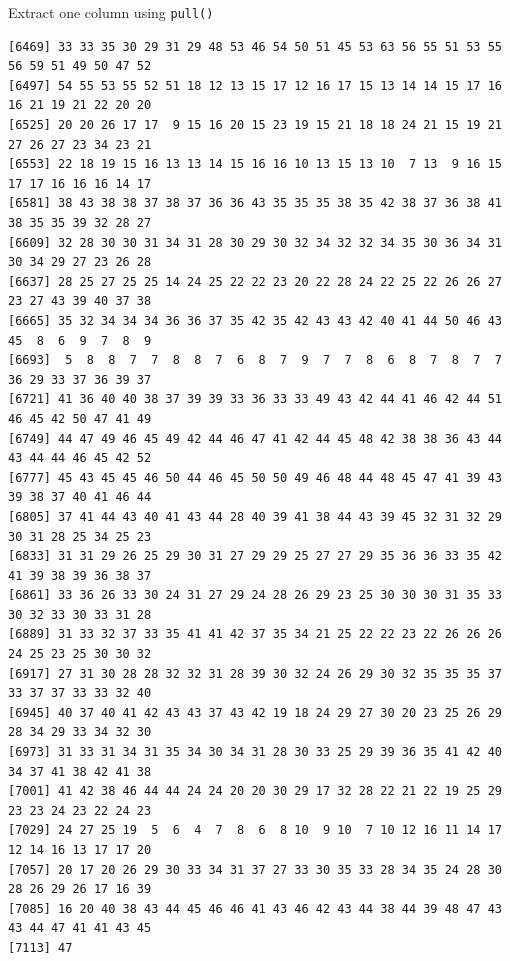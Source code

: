 \documentclass[
  ignorenonframetext,
  aspectratio=169,
]{beamer}
\let\oldtexttt\texttt
\renewcommand{\texttt}[1]{\colorbox{gray!20}{\oldtexttt{#1}}}
\begin{document}
\begin{frame}[fragile]{Extract one column using \texttt{pull()}}
\begin{verbatim}
[6469] 33 33 35 30 29 31 29 48 53 46 54 50 51 45 53 63 56 55 51 53 55 56 59 51 49 50 47 52
[6497] 54 55 53 55 52 51 18 12 13 15 17 12 16 17 15 13 14 14 15 17 16 16 21 19 21 22 20 20
[6525] 20 20 26 17 17  9 15 16 20 15 23 19 15 21 18 18 24 21 15 19 21 27 26 27 23 34 23 21
[6553] 22 18 19 15 16 13 13 14 15 16 16 10 13 15 13 10  7 13  9 16 15 17 17 16 16 16 14 17
[6581] 38 43 38 38 37 38 37 36 36 43 35 35 35 38 35 42 38 37 36 38 41 38 35 35 39 32 28 27
[6609] 32 28 30 30 31 34 31 28 30 29 30 32 34 32 32 34 35 30 36 34 31 30 34 29 27 23 26 28
[6637] 28 25 27 25 25 14 24 25 22 22 23 20 22 28 24 22 25 22 26 26 27 23 27 43 39 40 37 38
[6665] 35 32 34 34 34 36 36 37 35 42 35 42 43 43 42 40 41 44 50 46 43 45  8  6  9  7  8  9
[6693]  5  8  8  7  7  8  8  7  6  8  7  9  7  7  8  6  8  7  8  7  7 36 29 33 37 36 39 37
[6721] 41 36 40 40 38 37 39 39 33 36 33 33 49 43 42 44 41 46 42 44 51 46 45 42 50 47 41 49
[6749] 44 47 49 46 45 49 42 44 46 47 41 42 44 45 48 42 38 38 36 43 44 43 44 44 46 45 42 52
[6777] 45 43 45 45 46 50 44 46 45 50 50 49 46 48 44 48 45 47 41 39 43 39 38 37 40 41 46 44
[6805] 37 41 44 43 40 41 43 44 28 40 39 41 38 44 43 39 45 32 31 32 29 30 31 28 25 34 25 23
[6833] 31 31 29 26 25 29 30 31 27 29 29 25 27 27 29 35 36 36 33 35 42 41 39 38 39 36 38 37
[6861] 33 36 26 33 30 24 31 27 29 24 28 26 29 23 25 30 30 30 31 35 33 30 32 33 30 33 31 28
[6889] 31 33 32 37 33 35 41 41 42 37 35 34 21 25 22 22 23 22 26 26 26 24 25 23 25 30 30 32
[6917] 27 31 30 28 28 32 32 31 28 39 30 32 24 26 29 30 32 35 35 35 37 33 37 37 33 33 32 40
[6945] 40 37 40 41 42 43 43 37 43 42 19 18 24 29 27 30 20 23 25 26 29 28 34 29 33 34 32 30
[6973] 31 33 31 34 31 35 34 30 34 31 28 30 33 25 29 39 36 35 41 42 40 34 37 41 38 42 41 38
[7001] 41 42 38 46 44 44 24 24 20 20 30 29 17 32 28 22 21 22 19 25 29 23 23 24 23 22 24 23
[7029] 24 27 25 19  5  6  4  7  8  6  8 10  9 10  7 10 12 16 11 14 17 12 14 16 13 17 17 20
[7057] 20 17 20 26 29 30 33 34 31 37 27 33 30 35 33 28 34 35 24 28 30 28 26 29 26 17 16 39
[7085] 16 20 40 38 43 44 45 46 46 41 43 46 42 43 44 38 44 39 48 47 43 43 44 47 41 41 43 45
[7113] 47
\end{verbatim}

\normalsize
\end{frame}
\end{document}
